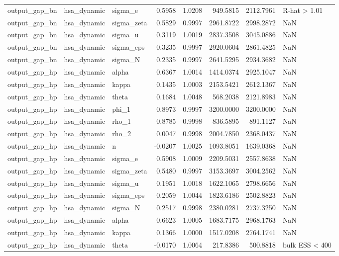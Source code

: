 \begin{tabular}{lllrrrrl}
output\_gap\_bn & hsa\_dynamic & sigma\_e & 0.5958 & 1.0208 & 949.5815 & 2112.7961 & R-hat > 1.01 \\
output\_gap\_bn & hsa\_dynamic & sigma\_zeta & 0.5829 & 0.9997 & 2961.8722 & 2998.2872 & NaN \\
output\_gap\_bn & hsa\_dynamic & sigma\_u & 0.3119 & 1.0019 & 2837.3508 & 3045.0886 & NaN \\
output\_gap\_bn & hsa\_dynamic & sigma\_eps & 0.3235 & 0.9997 & 2920.0604 & 2861.4825 & NaN \\
output\_gap\_bn & hsa\_dynamic & sigma\_N & 0.2335 & 0.9997 & 2641.5295 & 2934.3682 & NaN \\
output\_gap\_hp & hsa\_dynamic & alpha & 0.6367 & 1.0014 & 1414.0374 & 2925.1047 & NaN \\
output\_gap\_hp & hsa\_dynamic & kappa & 0.1435 & 1.0003 & 2153.5421 & 2612.1367 & NaN \\
output\_gap\_hp & hsa\_dynamic & theta & 0.1684 & 1.0048 & 568.2038 & 2121.8983 & NaN \\
output\_gap\_hp & hsa\_dynamic & phi\_1 & 0.8973 & 0.9997 & 3200.0000 & 3200.0000 & NaN \\
output\_gap\_hp & hsa\_dynamic & rho\_1 & 0.8785 & 0.9998 & 836.5895 & 891.1127 & NaN \\
output\_gap\_hp & hsa\_dynamic & rho\_2 & 0.0047 & 0.9998 & 2004.7850 & 2368.0437 & NaN \\
output\_gap\_hp & hsa\_dynamic & n & -0.0207 & 1.0025 & 1093.8051 & 1639.0368 & NaN \\
output\_gap\_hp & hsa\_dynamic & sigma\_e & 0.5908 & 1.0009 & 2209.5031 & 2557.8638 & NaN \\
output\_gap\_hp & hsa\_dynamic & sigma\_zeta & 0.5480 & 0.9997 & 3153.3697 & 3004.2562 & NaN \\
output\_gap\_hp & hsa\_dynamic & sigma\_u & 0.1951 & 1.0018 & 1622.1065 & 2798.6656 & NaN \\
output\_gap\_hp & hsa\_dynamic & sigma\_eps & 0.2059 & 1.0044 & 1823.6186 & 2502.8823 & NaN \\
output\_gap\_hp & hsa\_dynamic & sigma\_N & 0.2517 & 0.9998 & 2380.0281 & 2737.3250 & NaN \\
output\_gap\_hp & hsa\_dynamic & alpha & 0.6623 & 1.0005 & 1683.7175 & 2968.1763 & NaN \\
output\_gap\_hp & hsa\_dynamic & kappa & 0.1366 & 1.0000 & 1517.0208 & 2764.1741 & NaN \\
output\_gap\_hp & hsa\_dynamic & theta & -0.0170 & 1.0064 & 217.8386 & 500.8818 & bulk ESS < 400 \\

\end{tabular}
